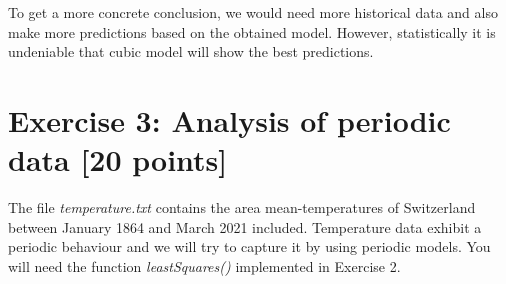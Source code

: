 \documentclass[unicode,11pt,a4paper,oneside,numbers=endperiod,openany]{scrartcl}
\begin{document}
\begin{enumerate}[label=(\alph*)]
To get a more concrete conclusion, we would need more historical data and also make more predictions based on the obtained model. However, statistically it is undeniable that cubic model will show the best predictions.\\

\end{enumerate}
\vspace{20px}

\newpage
\section*{Exercise 3: Analysis of periodic data [20 points]}

The file \textit{temperature.txt} contains the area mean-temperatures of Switzerland between January 1864 and March
2021 included. Temperature data exhibit a periodic behaviour and we will try to capture it by using periodic models.
You will need the function \textit{leastSquares()} implemented in Exercise 2. \\
\end{document}
